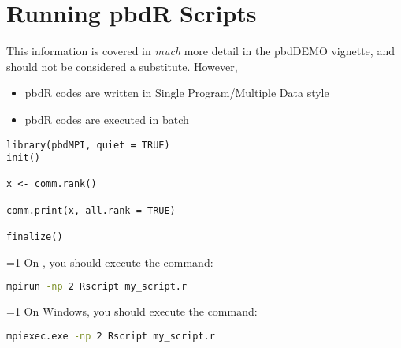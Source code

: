 \section{Running pbdR Scripts}
This information is covered in \emph{much} more detail in the pbdDEMO vignette, and should not be considered a substitute.  However, 

\begin{itemize}
  \item pbdR codes are written in Single Program/Multiple Data style
  \item pbdR codes are executed in batch
\end{itemize}



\begin{lstlisting}[language=rr]
library(pbdMPI, quiet = TRUE)
init()

x <- comm.rank()

comm.print(x, all.rank = TRUE)

finalize()
\end{lstlisting}


\ifnum\value{mac_or_lin}=1
On \maclin, you should execute the command:
\begin{lstlisting}[language=sh]
mpirun -np 2 Rscript my_script.r
\end{lstlisting}
\fi

\ifnum\value{include_windows}=1
On Windows, you should execute the command:
\begin{lstlisting}[language=sh]
mpiexec.exe -np 2 Rscript my_script.r
\end{lstlisting}
\fi


